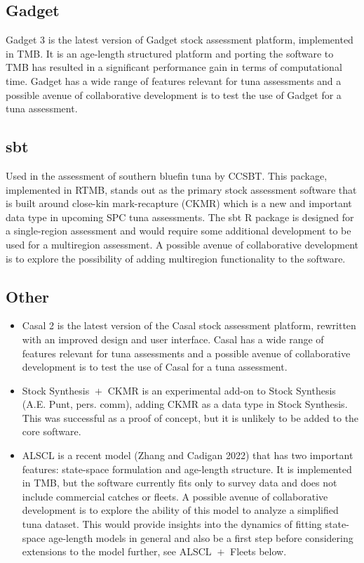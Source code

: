 \documentclass{SCreport}
\begin{document}
\subsection{Gadget}

Gadget 3 is the latest version of Gadget stock assessment platform, implemented
in TMB. It is an age-length structured platform and porting the software to TMB
has resulted in a significant performance gain in terms of computational time.
Gadget has a wide range of features relevant for tuna assessments and a possible
avenue of collaborative development is to test the use of Gadget for a tuna
assessment.

\subsection{sbt}

Used in the assessment of southern bluefin tuna by CCSBT. This package,
implemented in RTMB, stands out as the primary stock assessment software that is
built around close-kin mark-recapture (CKMR) which is a new and important data
type in upcoming SPC tuna assessments. The \textsf{sbt} R package is designed
for a single-region assessment and would require some additional development to
be used for a multiregion assessment. A possible avenue of collaborative
development is to explore the possibility of adding multiregion functionality to
the software.

\subsection{Other}

\begin{itemize}
  \item Casal 2 is the latest version of the Casal stock assessment platform,
  rewritten with an improved design and user interface. Casal has a wide range
  of features relevant for tuna assessments and a possible avenue of
  collaborative development is to test the use of Casal for a tuna assessment.
  \item Stock Synthesis $\!+\!$ CKMR is an experimental add-on to Stock
  Synthesis (A.E. Punt, pers. comm), adding CKMR as a data type in Stock
  Synthesis. This was successful as a proof of concept, but it is unlikely to be
  added to the core software.
  \item ALSCL is a recent model (Zhang and Cadigan 2022) that has two important
  features: state-space formulation and age-length structure. It is implemented
  in TMB, but the software currently fits only to survey data and does not
  include commercial catches or fleets. A possible avenue of collaborative
  development is to explore the ability of this model to analyze a simplified
  tuna dataset. This would provide insights into the dynamics of fitting
  state-space age-length models in general and also be a first step before
  considering extensions to the model further, see ALSCL $\!+\!$ Fleets below.
\end{itemize}
\end{document}
